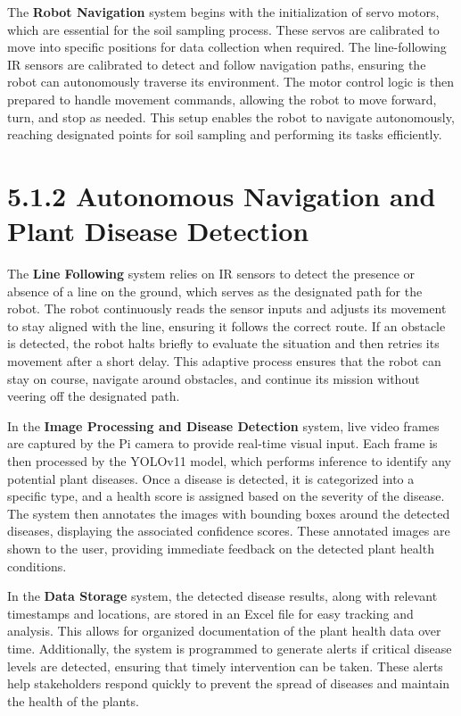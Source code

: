 \documentclass{book} %
\begin{document}
\noindent \textbf{}

\noindent The \textbf{Robot Navigation} system begins with the initialization of servo motors, which are essential for the soil sampling process. These servos are calibrated to move into specific positions for data collection when required. The line-following IR sensors are calibrated to detect and follow navigation paths, ensuring the robot can autonomously traverse its environment. The motor control logic is then prepared to handle movement commands, allowing the robot to move forward, turn, and stop as needed. This setup enables the robot to navigate autonomously, reaching designated points for soil sampling and performing its tasks efficiently.

\noindent 
\section{5.1.2 Autonomous Navigation and Plant Disease Detection}

\noindent The \textbf{Line Following} system relies on IR sensors to detect the presence or absence of a line on the ground, which serves as the designated path for the robot. The robot continuously reads the sensor inputs and adjusts its movement to stay aligned with the line, ensuring it follows the correct route. If an obstacle is detected, the robot halts briefly to evaluate the situation and then retries its movement after a short delay. This adaptive process ensures that the robot can stay on course, navigate around obstacles, and continue its mission without veering off the designated path.

\noindent \textbf{}

\noindent In the \textbf{Image Processing and Disease Detection} system, live video frames are captured by the Pi camera to provide real-time visual input. Each frame is then processed by the YOLOv11 model, which performs inference to identify any potential plant diseases. Once a disease is detected, it is categorized into a specific type, and a health score is assigned based on the severity of the disease. The system then annotates the images with bounding boxes around the detected diseases, displaying the associated confidence scores. These annotated images are shown to the user, providing immediate feedback on the detected plant health conditions.

\noindent \textbf{}

\noindent In the \textbf{Data Storage} system, the detected disease results, along with relevant timestamps and locations, are stored in an Excel file for easy tracking and analysis. This allows for organized documentation of the plant health data over time. Additionally, the system is programmed to generate alerts if critical disease levels are detected, ensuring that timely intervention can be taken. These alerts help stakeholders respond quickly to prevent the spread of diseases and maintain the health of the plants.
\end{document}
